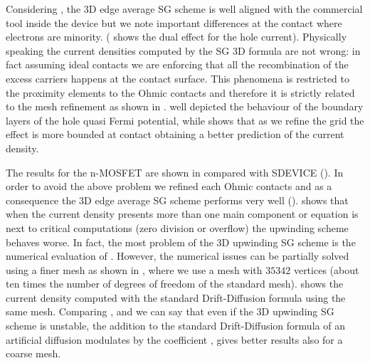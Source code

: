 Considering , the 3D edge average SG scheme is well aligned with the commercial tool inside the device but we note important differences at the contact where electrons are minority. ( shows the dual effect for the hole current). Physically speaking the current densities computed by the SG 3D formula are not wrong: in fact assuming ideal contacts we are enforcing that all the recombination of the excess carriers happens at the contact surface. This phenomena is restricted to the proximity elements to the Ohmic contacts and therefore it is strictly related to the mesh refinement as shown in . 
  well depicted the  behaviour of the boundary layers of the hole quasi Fermi potential, while  shows that as we refine the grid the effect is more bounded at contact obtaining a better prediction of the current density.

The results for the n-MOSFET are shown in  compared with SDEVICE (). In order to avoid the above problem we refined each Ohmic contacts and as a consequence the 3D edge average SG scheme performs very well ().  shows that when the current density presents more than one main component or equation  is next to critical computations (zero division or overflow) the upwinding scheme behaves worse. In fact, the most problem of the 3D upwinding SG scheme is the numerical evaluation of . However, the numerical issues can be partially solved using a finer mesh as shown in , where we use a mesh with $35342$ vertices (about ten times the number of degrees of freedom of the standard mesh).  shows the current density computed with the standard Drift-Diffusion formula using the same mesh. Comparing  ,  and  we can say that even if the 3D upwinding SG scheme is unstable, the addition  to the standard Drift-Diffusion formula of an artificial diffusion modulates by the coefficient , gives better results also for a coarse mesh.
  
